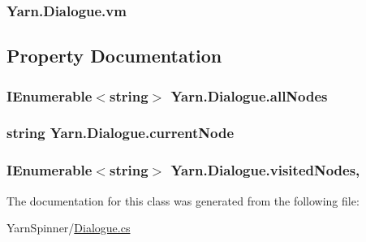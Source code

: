 \hypertarget{a00070_a8c1319357a9df6cff051328fb33224c7}{
\subsubsection[{vm}]{ Yarn.\-Dialogue.\-vm\hspace{0.3cm}{\ttfamily [private]}}}\label{a00070_a8c1319357a9df6cff051328fb33224c7}


\subsection{Property Documentation}
\hypertarget{a00070_a0ee573e3d072bccf98ba1d975612d42c}{
\subsubsection[{all\-Nodes}]{\setlength{\rightskip}{0pt plus 5cm}I\-Enumerable$<$string$>$ Yarn.\-Dialogue.\-all\-Nodes\hspace{0.3cm}{\ttfamily [get]}}}\label{a00070_a0ee573e3d072bccf98ba1d975612d42c}
\hypertarget{a00070_af368b5c342d585dc6953876c5965ccc8}{
\subsubsection[{current\-Node}]{\setlength{\rightskip}{0pt plus 5cm}string Yarn.\-Dialogue.\-current\-Node\hspace{0.3cm}{\ttfamily [get]}}}\label{a00070_af368b5c342d585dc6953876c5965ccc8}
\hypertarget{a00070_ac5661051e0b7f44527fe526c7766dbbf}{
\subsubsection[{visited\-Nodes}]{\setlength{\rightskip}{0pt plus 5cm}I\-Enumerable$<$string$>$ Yarn.\-Dialogue.\-visited\-Nodes\hspace{0.3cm}{\ttfamily [get]}, {\ttfamily [set]}}}\label{a00070_ac5661051e0b7f44527fe526c7766dbbf}


The documentation for this class was generated from the following file\-:\begin{DoxyCompactItemize}
\item 
Yarn\-Spinner/\hyperlink{a00262}{Dialogue.\-cs}\end{DoxyCompactItemize}
